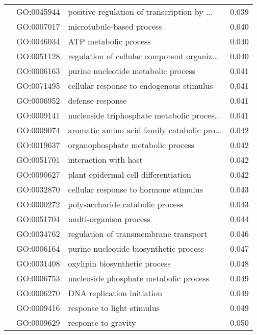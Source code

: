 \begin{longtable}{lllr}
   & GO:0045944 &  positive regulation of transcription by ... &         0.039 \\
   & GO:0007017 &                    microtubule-based process &         0.040 \\
   & GO:0046034 &                        ATP metabolic process &         0.040 \\
   & GO:0051128 &  regulation of cellular component organiz... &         0.040 \\
   & GO:0006163 &          purine nucleotide metabolic process &         0.041 \\
   & GO:0071495 &     cellular response to endogenous stimulus &         0.041 \\
   & GO:0006952 &                             defense response &         0.041 \\
   & GO:0009141 &  nucleoside triphosphate metabolic proces... &         0.041 \\
   & GO:0009074 &  aromatic amino acid family catabolic pro... &         0.042 \\
   & GO:0019637 &            organophosphate metabolic process &         0.042 \\
   & GO:0051701 &                        interaction with host &         0.042 \\
   & GO:0090627 &         plant epidermal cell differentiation &         0.042 \\
   & GO:0032870 &        cellular response to hormone stimulus &         0.043 \\
   & GO:0000272 &             polysaccharide catabolic process &         0.043 \\
   & GO:0051704 &                       multi-organism process &         0.044 \\
   & GO:0034762 &        regulation of transmembrane transport &         0.046 \\
   & GO:0006164 &       purine nucleotide biosynthetic process &         0.047 \\
   & GO:0031408 &                oxylipin biosynthetic process &         0.048 \\
   & GO:0006753 &       nucleoside phosphate metabolic process &         0.049 \\
   & GO:0006270 &                   DNA replication initiation &         0.049 \\
   & GO:0009416 &                   response to light stimulus &         0.049 \\
   & GO:0009629 &                          response to gravity &         0.050 \\

\end{longtable}
